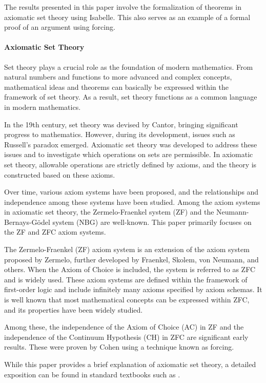 \documentclass{report}
\begin{document}
The results presented in this paper involve the formalization of theorems in axiomatic set theory using Isabelle. 
This also serves as an example of a formal proof of an argument using forcing.

\paragraph{Axiomatic Set Theory}

Set theory plays a crucial role as the foundation of modern mathematics. 
From natural numbers and functions to more advanced and complex concepts, 
mathematical ideas and theorems can basically be expressed within the framework of set theory. 
As a result, set theory functions as a common language in modern mathematics.

In the 19th century, set theory was devised by Cantor, bringing significant progress to mathematics. 
However, during its development, issues such as Russell's paradox emerged.
Axiomatic set theory was developed to address these issues and to investigate which operations on sets are permissible. 
In axiomatic set theory, allowable operations are strictly defined by axioms, and the theory is constructed based on these axioms.

Over time, various axiom systems have been proposed, 
and the relationships and independence among these systems have been studied. 
Among the axiom systems in axiomatic set theory, 
the Zermelo-Fraenkel system (ZF) and the Neumann-Bernays-Gödel system (NBG) are well-known. 
This paper primarily focuses on the ZF and ZFC axiom systems.

The Zermelo-Fraenkel (ZF) axiom system is an extension of the axiom system proposed by Zermelo, 
further developed by Fraenkel, Skolem, von Neumann, and others. 
When the Axiom of Choice is included, the system is referred to as ZFC and is widely used. 
These axiom systems are defined within the framework of first-order logic 
and include infinitely many axioms specified by axiom schemas.
It is well known that most mathematical concepts can be expressed within ZFC, 
and its properties have been widely studied.

Among these, the independence of the Axiom of Choice (AC) in ZF 
and the independence of the Continuum Hypothesis (CH) in ZFC are significant early results. 
These were proven by Cohen using a technique known as forcing.

While this paper provides a brief explanation of axiomatic set theory, 
a detailed exposition can be found in standard textbooks such as \cite{kunen2011,jech_set_theory}.
\end{document}
